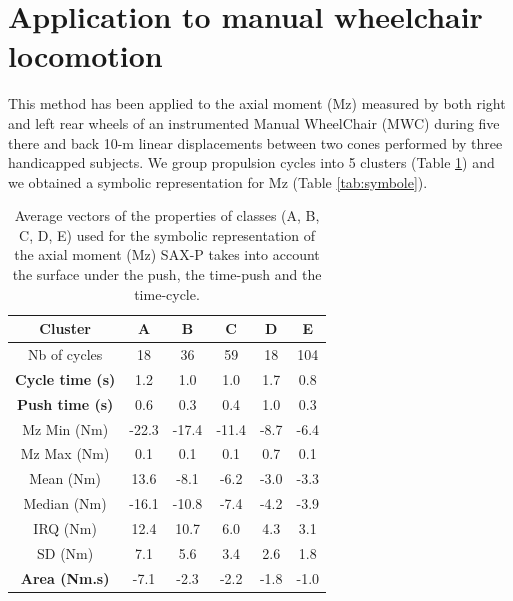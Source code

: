 
\section{Application to manual wheelchair locomotion}
This method has been applied to the axial moment (Mz) measured by both right and left rear wheels of
an instrumented Manual WheelChair (MWC) during five there and back 10-m linear displacements between
two cones performed by three handicapped subjects. We group propulsion cycles into 5 clusters  (Table
\ref{tab:centroide}) and we obtained a symbolic representation for Mz (Table
\ref{tab:symbole}).


\begin{center}

\begin{table}
\begin{tabular}{|c|c|c|c|c|c|}
\hline 
Cluster & A & B & C & D & E\tabularnewline
\hline 
\hline 
Nb of cycles & 18 & 36 & 59 & 18 & 104\tabularnewline
\hline 
\textbf{Cycle time (s)} & 1.2 & 1.0 & 1.0 & 1.7 & 0.8\tabularnewline
\hline 
\textbf{Push time (s)} & 0.6 & 0.3 & 0.4 & 1.0 & 0.3\tabularnewline
\hline 
Mz Min (Nm) & -22.3 & -17.4 & -11.4 & -8.7 & -6.4\tabularnewline
\hline 
Mz Max (Nm) & 0.1 & 0.1 & 0.1 & 0.7 & 0.1\tabularnewline
\hline 
Mean (Nm) & 13.6 & -8.1 & -6.2 & -3.0 & -3.3\tabularnewline
\hline 
Median (Nm) & -16.1 & -10.8 & -7.4 & -4.2 & -3.9\tabularnewline
\hline 
IRQ (Nm) & 12.4 & 10.7 & 6.0 & 4.3 & 3.1\tabularnewline
\hline 
SD (Nm) & 7.1 & 5.6 & 3.4 & 2.6 & 1.8\tabularnewline
\hline 
\textbf{Area (Nm.s)} & -7.1 & -2.3 & -2.2 & -1.8 & -1.0\tabularnewline
\hline 
\end{tabular}\protect\caption{Average vectors of the properties of classes (A, B, C, D, E) used
for the symbolic representation of the axial moment (Mz) SAX-P takes into account 
the surface under the push, the time-push and
the time-cycle.}
\label{tab:centroide}
\end{table}

\end{center}






